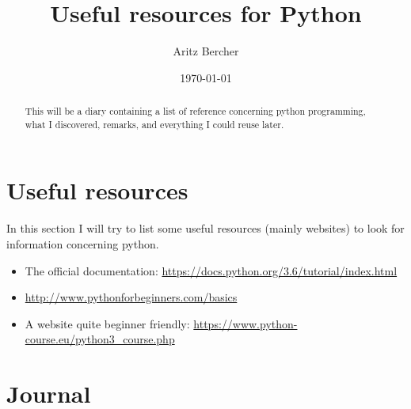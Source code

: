 \documentclass[11pt,a4paper]{article}
\title{Useful resources for Python}
\author{Aritz Bercher}
\date{\today}
\begin{document}
\maketitle

\begin{abstract}
This will be a diary containing a list of reference concerning python programming, what I discovered, remarks, and everything I could reuse later.
\end{abstract}

\tableofcontents

\section{Useful resources}
In this section I will try to list some useful resources (mainly websites) to look for information concerning python.
\begin{itemize}
\item The official documentation: \url{https://docs.python.org/3.6/tutorial/index.html}
\item \url{http://www.pythonforbeginners.com/basics}
\item A website quite beginner friendly: \url{https://www.python-course.eu/python3_course.php}
\end{itemize}

\section{Journal}
\end{document}
